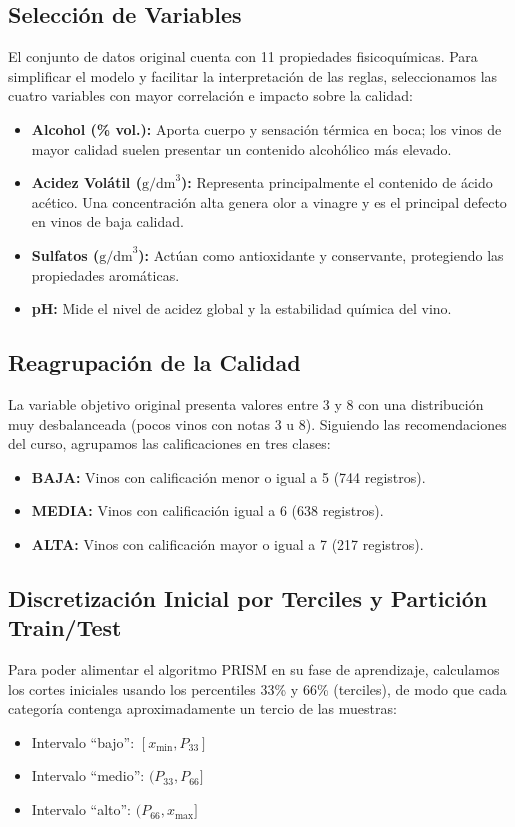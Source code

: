 \documentclass[11pt,a4paper]{article}
\begin{document}
\subsection{Selección de Variables}
El conjunto de datos original cuenta con 11 propiedades fisicoquímicas. Para simplificar el modelo y facilitar la interpretación de las reglas, seleccionamos las cuatro variables con mayor correlación e impacto sobre la calidad:
\begin{itemize}[noitemsep]
    \item \textbf{Alcohol (\% vol.):} Aporta cuerpo y sensación térmica en boca; los vinos de mayor calidad suelen presentar un contenido alcohólico más elevado.
    \item \textbf{Acidez Volátil ($\text{g/dm}^3$):} Representa principalmente el contenido de ácido acético. Una concentración alta genera olor a vinagre y es el principal defecto en vinos de baja calidad.
    \item \textbf{Sulfatos ($\text{g/dm}^3$):} Actúan como antioxidante y conservante, protegiendo las propiedades aromáticas.
    \item \textbf{pH:} Mide el nivel de acidez global y la estabilidad química del vino.
\end{itemize}

\subsection{Reagrupación de la Calidad}
La variable objetivo original presenta valores entre 3 y 8 con una distribución muy desbalanceada (pocos vinos con notas 3 u 8). Siguiendo las recomendaciones del curso, agrupamos las calificaciones en tres clases:
\begin{itemize}[noitemsep]
    \item \textbf{BAJA:} Vinos con calificación menor o igual a 5 (744 registros).
    \item \textbf{MEDIA:} Vinos con calificación igual a 6 (638 registros).
    \item \textbf{ALTA:} Vinos con calificación mayor o igual a 7 (217 registros).
\end{itemize}

\subsection{Discretización Inicial por Terciles y Partición Train/Test}
Para poder alimentar el algoritmo PRISM en su fase de aprendizaje, calculamos los cortes iniciales usando los percentiles 33\% y 66\% (terciles), de modo que cada categoría contenga aproximadamente un tercio de las muestras:
\begin{itemize}[noitemsep]
    \item Intervalo ``bajo'': $[x_{\min}, P_{33}]$
    \item Intervalo ``medio'': $(P_{33}, P_{66}]$
    \item Intervalo ``alto'': $(P_{66}, x_{\max}]$
\end{itemize}
\end{document}
